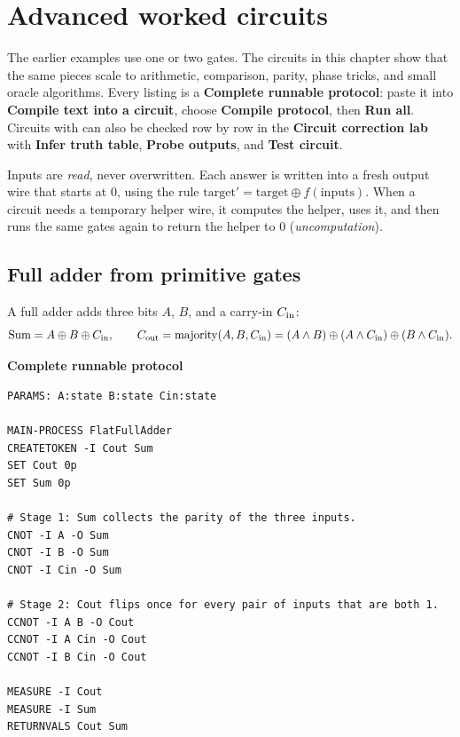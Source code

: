 \section{Advanced worked circuits}
\hypertarget{advanced-circuits}{}

The earlier examples use one or two gates. The circuits in this chapter show
that the same pieces scale to arithmetic, comparison, parity, phase tricks,
and small oracle algorithms. Every listing is a \textbf{Complete runnable
protocol}: paste it into \textbf{Compile text into a circuit}, choose
\textbf{Compile protocol}, then \textbf{Run all}. Circuits with 
can also be checked row by row in the \textbf{Circuit correction lab} with
\textbf{Infer truth table}, \textbf{Probe outputs}, and \textbf{Test circuit}.

\begin{beginnerbox}
Inputs are \emph{read}, never overwritten. Each answer is written into a
fresh output wire that starts at 0, using the rule
$\text{target}' = \text{target}\oplus f(\text{inputs})$. When a circuit needs a
temporary helper wire, it computes the helper, uses it, and then runs the same
gates again to return the helper to 0 (\emph{uncomputation}).
\end{beginnerbox}

\subsection{Full adder from primitive gates}

A full adder adds three bits $A$, $B$, and a carry-in $C_{\rm in}$:
\[
\mathrm{Sum}=A\oplus B\oplus C_{\rm in},\qquad
C_{\rm out}=\operatorname{majority}(A,B,C_{\rm in})
=(A\land B)\oplus(A\land C_{\rm in})\oplus(B\land C_{\rm in}).
\]

\textbf{Complete runnable protocol}
\begin{lstlisting}
PARAMS: A:state B:state Cin:state

MAIN-PROCESS FlatFullAdder
CREATETOKEN -I Cout Sum
SET Cout 0p
SET Sum 0p

# Stage 1: Sum collects the parity of the three inputs.
CNOT -I A -O Sum
CNOT -I B -O Sum
CNOT -I Cin -O Sum

# Stage 2: Cout flips once for every pair of inputs that are both 1.
CCNOT -I A B -O Cout
CCNOT -I A Cin -O Cout
CCNOT -I B Cin -O Cout

MEASURE -I Cout
MEASURE -I Sum
RETURNVALS Cout Sum
\end{lstlisting}

